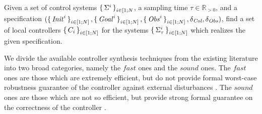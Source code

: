 \begin{comment}
 \item for \emph{every} $k\leq K$ and every $1\leq i\le N$ we have $D(x^i_k,obs)>\delta_{\obs}$.
 
 \end{itemize}
 For a given control system $\Sigma$, the targetted problem is denoted by a tuple $(x_0, \reach,\obs, \delta_{\obs},\delta_{\col})$. In linear temporal logic (LTL) notation \cite{baier2008principles}, the above conditions can be succinctly written as:
\begin{equation}\label{eq:spec}
	x_0 \wedge ([\bigwedge_{1\leq i\leq N}D(x^i,\obs)>\delta_{obs}\; \bigwedge_{1\leq i,j\leq N\;i\neq j}  d(x^i,x^j)>\delta_{\col}]\; \mathcal{U}\;\reach) .
\end{equation}
\end{comment}

\begin{problem}\label{prob:reach-avoid}
	Given a set of control systems $\set{\Sigma^i}_{i\in [1;N}$, a sampling time $\tau\in \mathbb{R}_{>0}$, and a specification $(\set{\mathit{Init}^i}_{i\in [1;N]}, \set{\mathit{Goal}^i}_{i\in [1;N]}, \set{\mathit{Obs}^i}_{i\in [1;N]}, \delta_{\mathit{Col}}, \delta_{\mathit{Obs}})$, find a set of local controllers $\set{C_i}_{i\in [1;N]}$ for the systems $\set{\Sigma_\tau^i}_{i\in [1;N]}$ which realizes the given specification.
\end{problem}

 

We divide the available controller synthesis techniques from the existing literature into two broad categories, namely the $\mathit{fast}$ ones and the $\mathit{sound}$ ones.
The $\mathit{fast}$ ones are those which are extremely efficient, but do not provide formal worst-case robustness guarantee of the controller against external disturbances \cite{howell2019altro,choset2005principles}.
The $\mathit{sound}$ ones are those which are not so efficient, but provide strong formal guarantee on the correctness of the controller \cite{reissig2016feedback,fisac2015reach,tedrake2009lqr}.

